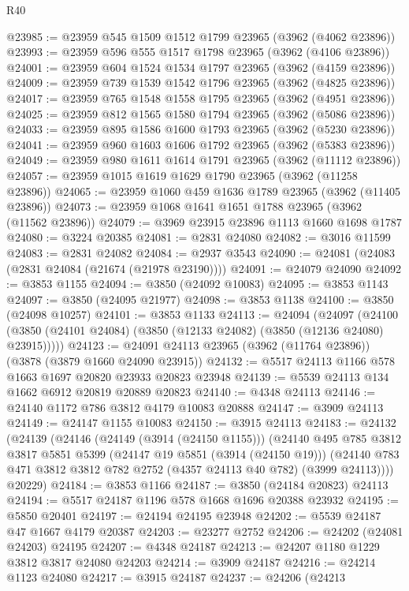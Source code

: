 \begin{lexlean}{R40}
\begin{coremodule}
@23985 := @23959 @545 @1509 @1512 @1799 @23965 (@3962 (@4062 @23896))
@23993 := @23959 @596 @555 @1517 @1798 @23965 (@3962 (@4106 @23896))
@24001 := @23959 @604 @1524 @1534 @1797 @23965 (@3962 (@4159 @23896))
@24009 := @23959 @739 @1539 @1542 @1796 @23965 (@3962 (@4825 @23896))
@24017 := @23959 @765 @1548 @1558 @1795 @23965 (@3962 (@4951 @23896))
@24025 := @23959 @812 @1565 @1580 @1794 @23965 (@3962 (@5086 @23896))
@24033 := @23959 @895 @1586 @1600 @1793 @23965 (@3962 (@5230 @23896))
@24041 := @23959 @960 @1603 @1606 @1792 @23965 (@3962 (@5383 @23896))
@24049 := @23959 @980 @1611 @1614 @1791 @23965 (@3962 (@11112 @23896))
@24057 := @23959 @1015 @1619 @1629 @1790 @23965 (@3962 (@11258 @23896))
@24065 := @23959 @1060 @459 @1636 @1789 @23965 (@3962 (@11405 @23896))
@24073 := @23959 @1068 @1641 @1651 @1788 @23965 (@3962 (@11562 @23896))
@24079 := @3969 @23915 @23896 @1113 @1660 @1698 @1787
@24080 := @3224 @20385
@24081 := @2831 @24080
@24082 := @3016 @11599
@24083 := @2831 @24082
@24084 := @2937 @3543
@24090 := @24081 (@24083 (@2831 @24084 (@21674 (@21978 @23190))))
@24091 := @24079 @24090
@24092 := @3853 @1155
@24094 := @3850 (@24092 @10083)
@24095 := @3853 @1143
@24097 := @3850 (@24095 @21977)
@24098 := @3853 @1138
@24100 := @3850 (@24098 @10257)
@24101 := @3853 @1133
@24113 := @24094
    (@24097 (@24100 (@3850 (@24101 @24084) (@3850 (@12133 @24082) (@3850 (@12136 @24080) @23915)))))
@24123 := @24091 @24113 @23965 (@3962 (@11764 @23896)) (@3878 (@3879 @1660 @24090 @23915))
@24132 := @5517 @24113 @1166 @578 @1663 @1697 @20820 @23933 @20823 @23948
@24139 := @5539 @24113 @134 @1662 @6912 @20819 @20889 @20823
@24140 := @4348 @24113
@24146 := @24140 @1172 @786 @3812 @4179 @10083 @20888
@24147 := @3909 @24113
@24149 := @24147 @1155 @10083
@24150 := @3915 @24113
@24183 := @24132
    (@24139
      (@24146
        (@24149 (@3914 (@24150 @1155)))
        (@24140
          @495
          @785
          @3812
          @3817
          @5851
          @5399
          (@24147 @19 @5851 (@3914 (@24150 @19)))
          (@24140 @783 @471 @3812 @3812 @782 @2752 (@4357 @24113 @40 @782) (@3999 @24113))))
      @20229)
@24184 := @3853 @1166
@24187 := @3850 (@24184 @20823) @24113
@24194 := @5517 @24187 @1196 @578 @1668 @1696 @20388 @23932
@24195 := @5850 @20401
@24197 := @24194 @24195 @23948
@24202 := @5539 @24187 @47 @1667 @4179 @20387
@24203 := @23277 @2752
@24206 := @24202 (@24081 @24203) @24195
@24207 := @4348 @24187
@24213 := @24207 @1180 @1229 @3812 @3817 @24080 @24203
@24214 := @3909 @24187
@24216 := @24214 @1123 @24080
@24217 := @3915 @24187
@24237 := @24206
    (@24213

\end{coremodule}
\end{lexlean}
